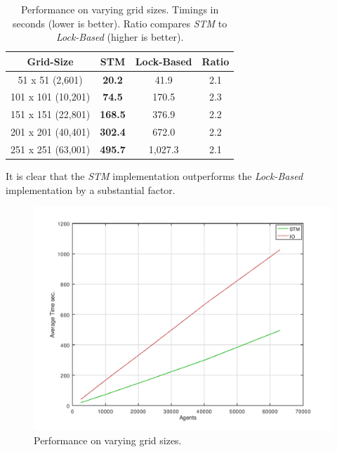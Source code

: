 \begin{table}
	\centering
  	\begin{tabular}{ c || c | c | c }
        Grid-Size          & STM              & Lock-Based   & Ratio \\ \hline \hline 
   		51 x 51 (2,601)    & \textbf{20.2}    & 41.9         & 2.1 \\ \hline
   		101 x 101 (10,201) & \textbf{74.5}    & 170.5        & 2.3 \\ \hline
   		151 x 151 (22,801) & \textbf{168.5}   & 376.9        & 2.2 \\ \hline
   		201 x 201 (40,401) & \textbf{302.4}   & 672.0        & 2.2 \\ \hline
   		251 x 251 (63,001) & \textbf{495.7}   & 1,027.3      & 2.1 \\ \hline \hline
  	\end{tabular}

  	\caption{Performance on varying grid sizes. Timings in seconds (lower is better). Ratio compares \textit{STM} to \textit{Lock-Based} (higher is better).}
	\label{tab:varyinggrid_constcores}
\end{table}

It is clear that the \textit{STM} implementation outperforms the \textit{Lock-Based} implementation by a substantial factor.

\begin{figure}
	\centering
	\includegraphics[width=1\textwidth, angle=0]{./fig/concurrentabs/sir/stm_io_varyinggrid_performance.png}
	\caption{Performance on varying grid sizes.}
	\label{fig:varyinggrid_constcores}
\end{figure}

